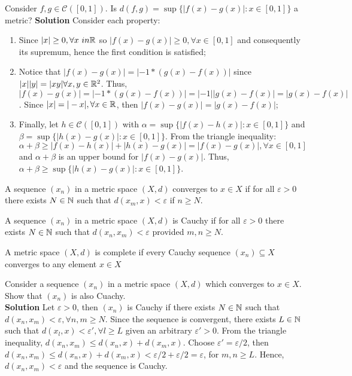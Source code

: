 \begin{eg}
    Consider $f, g \in \mathcal{C}([0,1])$. Is $d(f,g) = \sup\{|f(x) - g(x)|: x \in [0,1]\}$ a metric?
    \textbf{Solution}
    Consider each property:
    \begin{enumerate}
        \item Since $|x| \geq 0, \forall x \ in \mathbb{R}$ so $|f(x) - g(x)| \geq 0, \forall x \in [0,1]$ and consequently its supremum, hence the first condition is satisfied;
        \item Notice that $|f(x) - g(x)| = |-1*(g(x) - f(x))|$ since $|x||y| = |xy| \forall x,y \in \mathbb{R}^2$. Thus, $|f(x) - g(x)| = |-1*(g(x) - f(x))| = |-1||g(x) - f(x)| = |g(x) - f(x)|$. Since $|x| = |-x|, \forall x \in \mathbb{R}$, then $|f(x) - g(x)| = |g(x) - f(x)|$;
        \item Finally, let $h \in \mathcal{C}([0, 1])$ with $\alpha = \sup \{|f(x) - h(x)|: x \in [0,1] \}$ and $\beta = \sup \{|h(x) - g(x)|: x \in [0,1] \}$. From the triangle inequality: $\alpha + \beta \geq |f(x) - h(x)| + |h(x) - g(x)| = |f(x) - g(x)|, \forall x \in [0,1]$ and $\alpha + \beta$ is an upper bound for $|f(x) - g(x)|$. Thus, $\alpha + \beta \geq \sup\{|h(x) - g(x)|: x \in [0,1]\}$.
    \end{enumerate}
\end{eg}

\begin{definition}[Convergence]
    A sequence $(x_n) $ in a metric space $(X, d)$ converges to $x \in X$ if for all $\varepsilon > 0$ there exists $N \in \mathbb{N}$ such that $d(x_m, x) < \varepsilon$ if $n \geq N$.
\end{definition}

\begin{definition}
    A sequence $(x_n)$ in a metric space $(X, d)$ is Cauchy if for all $\varepsilon > 0$ there exists $N \in \mathbb{N}$ such that $d(x_n, x_m) < \varepsilon$ provided $m, n \geq N$.
\end{definition}

\begin{definition}
    A metric space $(X, d)$ is complete if every Cauchy sequence $(x_n) \subseteq X$ converges to any element $x \in X$
\end{definition}

\begin{eg}
    Consider a sequence $(x_n)$ in a metric space $(X, d)$ which converges to $x \in X$. Show that $(x_n)$ is also Cuachy.\\
    \textbf{Solution}
    Let $\varepsilon > 0$, then $(x_n)$ is Cauchy if there exists $N \in \mathbb{N}$ such that $d(x_n, x_m) < \varepsilon, \forall n, m \geq N$. Since the sequence is convergent, there exists $L \in \mathbb{N}$ such that $d(x_{l}, x) < \varepsilon', \forall l \geq L$ given an arbitrary $\varepsilon' > 0$. From the triangle inequality, $d(x_n, x_m) \leq d(x_n, x) + d(x_m, x)$. Choose $\varepsilon' = \varepsilon/2$, then $d(x_n, x_m) \leq d(x_n, x) + d(x_m, x) < \varepsilon/2 + \varepsilon/2 = \varepsilon$, for $m, n \geq L$. Hence, $d(x_n, x_m) < \varepsilon$ and the sequence is Cauchy.
\end{eg}

